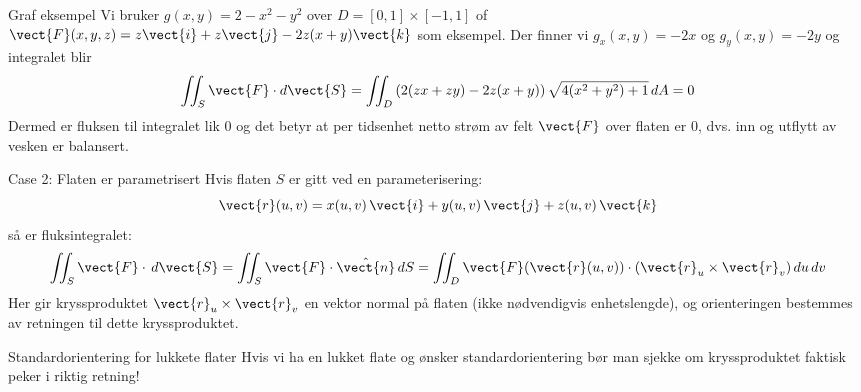 \begin{eks}{Graf eksempel}
Vi bruker $g(x,y)=2-x^2-y^2$ over $D=[0,1] \times [-1,1]$ of $\vect{F}(x,y,z)=z\vect{i}+z\vect{j}-2z(x+y)\vect{k}$ som eksempel. Der finner vi $g_x(x,y)=-2x$ og $g_y(x,y)=-2y$ og integralet blir
\[\iint_S \vect{F} \cdot d \vect{S} = \iint_D \left(2(zx+zy)-2z(x+y)\right)\sqrt{4(x^2+y^2)+1}\, dA = 0\]
Dermed er fluksen til integralet lik $0$ og det betyr at per tidsenhet netto strøm av felt $\vect{F}$ over flaten er $0$, dvs. inn og utflytt av vesken er balansert.
\end{eks}

\begin{oppsum}{Case 2: Flaten er parametrisert}
Hvis flaten \( S \) er gitt ved en parameterisering:
\[
\vect{r}(u, v) = x(u, v)\, \vect{i} + y(u, v)\, \vect{j} + z(u, v)\, \vect{k}
\]
så er fluksintegralet:
\[
\iint_S \vect{F} \cdot\, d\vect{S} = \iint_S \vect{F} \cdot \hat{\vect{n}}\, dS = \iint_D \vect{F}(\vect{r}(u,v)) \cdot (\vect{r}_u \times \vect{r}_v)\, du\, dv
\]
Her gir kryssproduktet \( \vect{r}_u \times \vect{r}_v \) en vektor normal på flaten (ikke nødvendigvis enhetslengde), og orienteringen bestemmes av retningen til dette kryssproduktet.
\begin{minipage}{\textwidth}
\begin{rem}{Standardorientering for lukkete flater} Hvis vi ha en lukket flate og ønsker standardorientering bør man sjekke om kryssproduktet faktisk peker i riktig retning!
\end{rem}
\end{minipage}
\end{oppsum}

